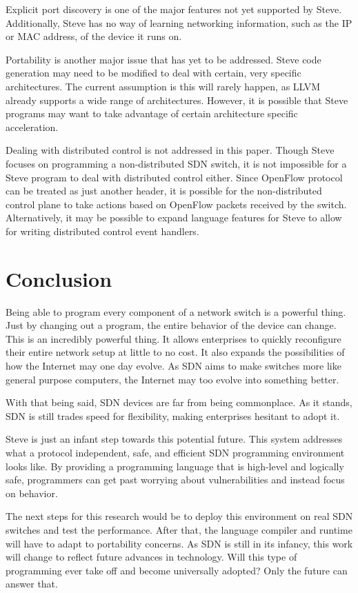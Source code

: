 Explicit port discovery is one of the major features not yet supported by Steve. Additionally, Steve has no way of learning networking information, such as the IP or MAC address, of the device it runs on.

Portability is another major issue that has yet to be addressed. Steve code generation may need to be modified to deal with certain, very specific architectures. The current assumption is this will rarely happen, as LLVM already supports a wide range of architectures. However, it is possible that Steve programs may want to take advantage of certain architecture specific acceleration.

Dealing with distributed control is not addressed in this paper. Though Steve focuses on programming a non-distributed SDN switch, it is not impossible for a Steve program to deal with distributed control either. Since OpenFlow protocol can be treated as just another header,
it is possible for the non-distributed control plane to take actions based on OpenFlow packets received by the switch. Alternatively, it may be possible to expand language features for Steve to allow for writing distributed control event handlers.

\section{Conclusion}

Being able to program every component of a network switch is a powerful thing. Just by changing out a program, the entire behavior of the device can change. This is an incredibly powerful thing. It allows enterprises to quickly reconfigure their entire network setup at little to no cost. It also expands the possibilities of how the Internet may one day evolve. As SDN aims to make switches more like general purpose computers, the Internet may too evolve into something better.

With that being said, SDN devices are far from being commonplace. As it stands, SDN is still trades speed for flexibility, making enterprises hesitant to adopt it. 

Steve is just an infant step towards this potential future. This system addresses what a protocol independent, safe, and efficient SDN programming environment looks like. By providing a programming language that is high-level and logically safe, programmers
can get past worrying about vulnerabilities and instead focus on behavior.

The next steps for this research would be to deploy this environment on real SDN switches and test the performance. After that, the language compiler and runtime will have to adapt to portability concerns. As SDN is still in its infancy, this work will change to reflect future advances in technology. Will this type of programming ever take off and become universally adopted? Only the future can answer that.
